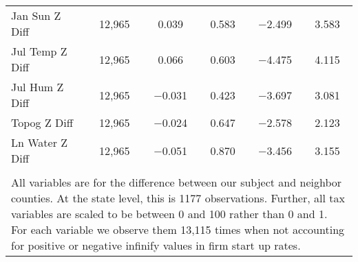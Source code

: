 \begin{table}[!htbp]
\begin{tabular}{@{\extracolsep{5pt}}lccccc}
Jan Sun Z Diff & 12,965 & 0.039 & 0.583 & $-$2.499 & 3.583 \\ 
Jul Temp Z Diff & 12,965 & 0.066 & 0.603 & $-$4.475 & 4.115 \\ 
Jul Hum Z Diff & 12,965 & $-$0.031 & 0.423 & $-$3.697 & 3.081 \\ 
Topog Z Diff & 12,965 & $-$0.024 & 0.647 & $-$2.578 & 2.123 \\ 
Ln Water Z Diff & 12,965 & $-$0.051 & 0.870 & $-$3.456 & 3.155 \\ 
\hline \\[-1.8ex] 
\multicolumn{6}{l}{All variables are for the difference between our subject and neighbor counties. At the state level, this is 1177 observations. Further, all tax variables are scaled to be between 0 and 100 rather than 0 and 1. For each variable we observe them 13,115 times when not accounting for positive or negative infinify values in firm start up rates.} \\ 
\end{tabular} 
\end{table} 

